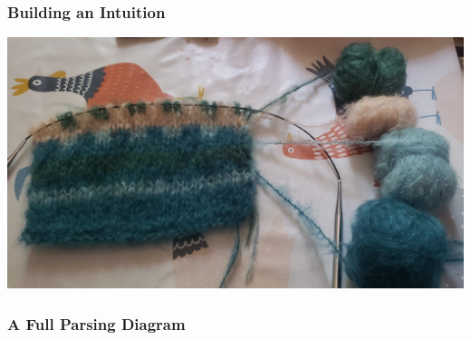 \documentclass[math, english, info]{beamercours}
\begin{document}
\begin{frame}
	\frametitle{Building an Intuition}
	\centering
	\includegraphics[width=.7\textwidth]{aux/figures/knitting-example.jpeg}
\end{frame}

\begin{frame}
	\frametitle{A Full Parsing Diagram}
	\vspace{-.25cm}
	\centering
\end{frame}
\end{document}
